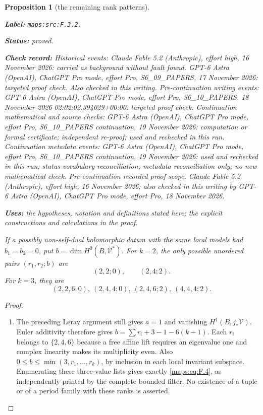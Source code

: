 \documentclass[11pt,a4paper]{article}
\newtheorem{proposition}[proposition]{Proposition}
\theoremstyle{definition}
\newcommand{\StatementRecord}[4]{\par\smallskip\begingroup\upshape\raggedright\noindent\textbf{Label:} \nolinkurl{#1}.\par\noindent\textbf{Status:} #2.\par\noindent\textbf{Check record:} #3.\par\noindent\textbf{Uses:} #4.\par\endgroup\smallskip}
\begin{document}
\begin{proposition}[the remaining rank patterns]\label{maps:src:F.3.2}
\StatementRecord{maps:src:F.3.2}{proved}{Historical events: Claude Fable 5.2 (Anthropic), effort high, 16 November 2026: carried as background without fault found. GPT-6 Astra (OpenAI), ChatGPT Pro mode, effort Pro, S6\_09\_PAPERS, 17 November 2026: targeted proof check. Also checked in this writing. Pre-continuation writing events: GPT-6 Astra (OpenAI), ChatGPT Pro mode, effort Pro, S6\_10\_PAPERS, 18 November 2026 02:02:02.394029+00:00: targeted proof check. Continuation mathematical and source checks: GPT-6 Astra (OpenAI), ChatGPT Pro mode, effort Pro, S6\_10\_PAPERS continuation, 19 November 2026: computation or formal certificate; independent re-proof; used and rechecked in this run. Continuation metadata events: GPT-6 Astra (OpenAI), ChatGPT Pro mode, effort Pro, S6\_10\_PAPERS continuation, 19 November 2026: used and rechecked in this run; status-vocabulary reconciliation; metadata reconciliation only; no new mathematical check. \emph{Pre-continuation recorded proof scope.} Claude Fable 5.2 (Anthropic), effort high, 16 November 2026; also checked in this writing by GPT-6 Astra (OpenAI), ChatGPT Pro mode, effort Pro, 18 November 2026}{the hypotheses, notation and definitions stated here; the explicit constructions and calculations in the proof}


If a possibly non-self-dual holomorphic datum with the same
local models had $b_1=b_2=0$, put
$b=\dim H^0(B,\mathcal V^*)$.  For $k=2$, the only possible
unordered pairs $(r_1,r_2;b)$ are
\[
 (2,2;0),\qquad(2,4;2).
\]
For $k=3$, they are
\[
 (2,2,6;0),\ (2,4,4;0),\ (2,4,6;2),\ (4,4,4;2).
 \tag{F.4}\label{maps:eq:F.4}
\]

\end{proposition}


\begin{proof}
\begin{enumerate}[label=\arabic*.]
\item The preceding Leray argument still gives $a=1$ and vanishing
$H^1(B,j_*\mathcal V)$.  Euler additivity therefore gives
$b=\sum r_i+3-1-6(k-1)$.  Each $r_i$ belongs to
$\{2,4,6\}$ because a free affine lift requires an eigenvalue
one and complex linearity makes its multiplicity even.
Also $0\leq b\leq\min(3,r_1,\ldots,r_k)$, by inclusion in
each local invariant subspace.  Enumerating these three-value
lists gives exactly \eqref{maps:eq:F.4}, as independently printed by the
complete bounded filter.  No existence of a tuple or of a
period family with these ranks is asserted.

\end{enumerate}
\end{proof}
\end{document}
